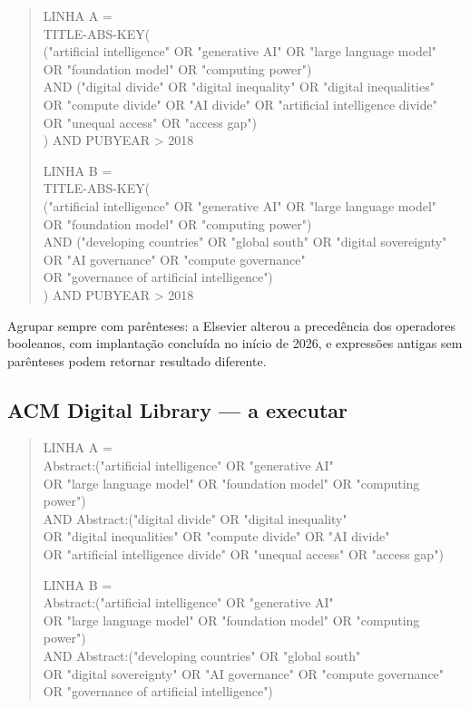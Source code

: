 \documentclass[12pt,a4paper]{article}
\begin{document}
\begin{quote}\scriptsize\ttfamily
LINHA A =\\
TITLE-ABS-KEY(\\
 ("artificial intelligence" OR "generative AI" OR "large language model"\\
  OR "foundation model" OR "computing power")\\
 AND ("digital divide" OR "digital inequality" OR "digital inequalities"\\
  OR "compute divide" OR "AI divide" OR "artificial intelligence divide"\\
  OR "unequal access" OR "access gap")\\
) AND PUBYEAR > 2018

\vspace{0.6em}
LINHA B =\\
TITLE-ABS-KEY(\\
 ("artificial intelligence" OR "generative AI" OR "large language model"\\
  OR "foundation model" OR "computing power")\\
 AND ("developing countries" OR "global south" OR "digital sovereignty"\\
  OR "AI governance" OR "compute governance"\\
  OR "governance of artificial intelligence")\\
) AND PUBYEAR > 2018
\end{quote}

\noindent Agrupar sempre com parênteses: a Elsevier alterou a precedência dos operadores
booleanos, com implantação concluída no início de 2026, e expressões antigas sem
parênteses podem retornar resultado diferente.

\subsection{ACM Digital Library --- a executar}

\begin{quote}\scriptsize\ttfamily
LINHA A =\\
Abstract:("artificial intelligence" OR "generative AI"\\
 OR "large language model" OR "foundation model" OR "computing power")\\
AND Abstract:("digital divide" OR "digital inequality"\\
 OR "digital inequalities" OR "compute divide" OR "AI divide"\\
 OR "artificial intelligence divide" OR "unequal access" OR "access gap")

\vspace{0.6em}
LINHA B =\\
Abstract:("artificial intelligence" OR "generative AI"\\
 OR "large language model" OR "foundation model" OR "computing power")\\
AND Abstract:("developing countries" OR "global south"\\
 OR "digital sovereignty" OR "AI governance" OR "compute governance"\\
 OR "governance of artificial intelligence")
\end{quote}
\end{document}
